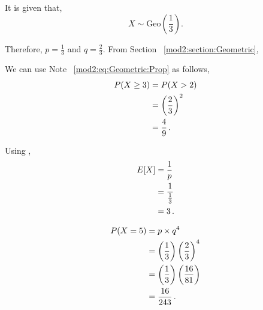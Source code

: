 \begin{subquestions}
\begin{subsubquestions}
\end{subsubquestions}


\subquestion

It is given that,
\begin{equation}
	X \sim \text{Geo}\left(\frac{1}{3}\right).
\end{equation}

Therefore, $p=\frac{1}{3}$ and $q=\frac{2}{3}$. From Section ~\ref{mod2:section:Geometric},

\begin{subsubquestions}

\subsubquestion
We can use Note ~\ref{mod2:eq:Geometric:Prop} as follows,
\begin{align}
	P(X \geq 3) & = P(X > 2) \nonumber \\
	            & = \left(\frac{2}{3} \right)^2 \nonumber \\
	            & = \frac{4}{9} \,.
\end{align}


\subsubquestion
Using ,
\begin{align}
	E[X] & = \frac{1}{p} \nonumber \\
	     & = \frac{1}{\frac{1}{3}} \nonumber \\
	     & = 3 \,.
\end{align}


\subsubquestion

\begin{align}
	P(X=5) & = p \times q^4 \nonumber \\
	       & = \left(\frac{1}{3} \right) \left(\frac{2}{3} \right)^4 \nonumber \\
	       & = \left(\frac{1}{3} \right) \left(\frac{16}{81} \right) \nonumber \\
           & = \frac{16}{243} \,. 
\end{align}

\end{subsubquestions}



\end{subquestions}
